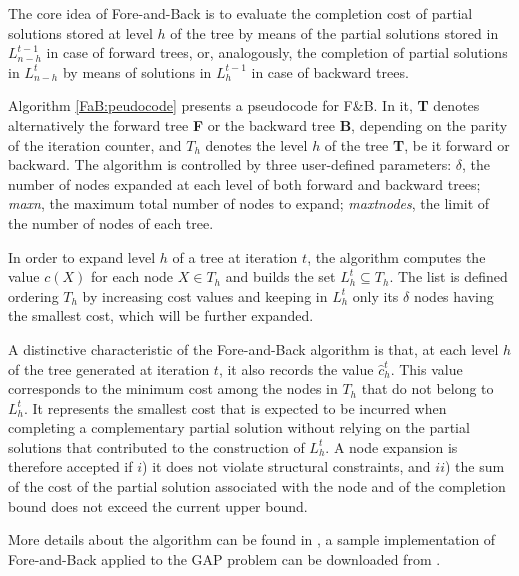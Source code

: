 \documentclass[runningheads]{llncs}
\begin{document}
The core idea of Fore-and-Back is to evaluate the completion cost of partial solutions stored at level $h$ of the tree by means of the partial solutions stored in $L^{t-1}_{n-h}$ in case of forward trees, or, analogously, the completion of partial solutions in $L^t_{n-h}$ by means of solutions in $L^{t-1}_h$ in case of backward trees. 

Algorithm \ref{FaB:peudocode} presents a pseudocode for F\&B. In it, {\bf T} denotes alternatively the forward tree {\bf F} or the backward tree {\bf B}, depending on the parity of the iteration counter, and $T_h$ denotes the level $h$ of the tree {\bf T}, be it forward or backward.
The algorithm is controlled by three user-defined parameters: $\delta$, the number of nodes expanded at each level of both forward and backward trees; {\it maxn}, the maximum total number of nodes to expand; {\it maxtnodes}, the limit of the number of nodes of each tree. 

In order to expand level $h$ of a tree at iteration $t$, the algorithm computes the value $c(X)$ for each node $X \in T_h$ and builds the set $L^t_h \subseteq T_h$. The list is defined ordering $T_h$ by increasing cost values and keeping in $L^t_h$ only its $\delta$ nodes having the smallest cost, which will be further expanded.

A distinctive characteristic of the Fore-and-Back algorithm is that, at each level $h$ of the tree generated at iteration $t$, it also records the value $\hat{c}^t_h$. This value corresponds to the minimum cost among the nodes in $T_h$ that do not belong to $L^t_h$. It represents the smallest cost that is expected to be incurred when completing a complementary partial solution without relying on the partial solutions that contributed to the construction of $L^t_h$. A node expansion is therefore accepted if $i$) it does not violate structural constraints, and $ii$) the sum of the cost of the partial solution associated with the node and of the completion bound does not exceed the current upper bound.

More details about the algorithm can be found in \cite{the_book}, a sample implementation of Fore-and-Back applied to the GAP problem can be downloaded from \cite{M21github}.
\end{document}
